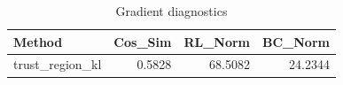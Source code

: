\begin{table}[htbp]
\centering
\caption{Gradient diagnostics}
\label{tab:grad-diag}
\begin{tabular}{lrrr}
\toprule
\textbf{Method} & \textbf{Cos\_Sim} & \textbf{RL\_Norm} & \textbf{BC\_Norm} \\
\midrule
trust\_region\_kl & 0.5828 & 68.5082 & 24.2344 \\
\bottomrule
\end{tabular}
\end{table}